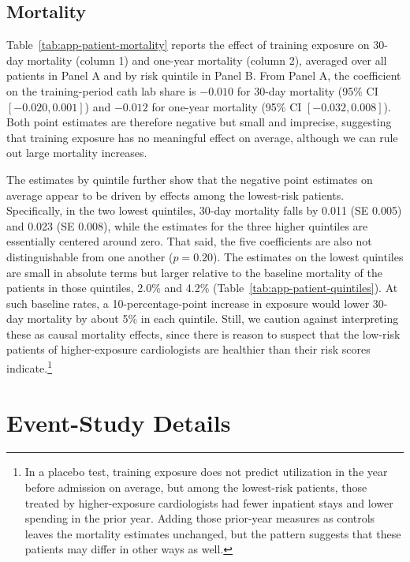 \documentclass[12pt]{article}
\begin{document}
\subsection{Mortality}\label{sec:app-patient-mortality}

Table~\ref{tab:app-patient-mortality} reports the effect of training exposure on 30-day mortality (column 1) and one-year mortality (column 2), averaged over all patients in Panel A and by risk quintile in Panel B. From Panel A, the coefficient on the training-period cath lab share is $-0.010$ for 30-day mortality (95\% CI $[-0.020, 0.001]$) and $-0.012$ for one-year mortality (95\% CI $[-0.032, 0.008]$). Both point estimates are therefore negative but small and imprecise, suggesting that training exposure has no meaningful effect on average, although we can rule out large mortality increases.

The estimates by quintile further show that the negative point estimates on average appear to be driven by effects among the lowest-risk patients. Specifically, in the two lowest quintiles, 30-day mortality falls by 0.011 (SE 0.005) and 0.023 (SE 0.008), while the estimates for the three higher quintiles are essentially centered around zero. That said, the five coefficients are also not distinguishable from one another ($p = 0.20$). The estimates on the lowest quintiles are small in absolute terms but larger relative to the baseline mortality of the patients in those quintiles, 2.0\% and 4.2\% (Table~\ref{tab:app-patient-quintiles}). At such baseline rates, a 10-percentage-point increase in exposure would lower 30-day mortality by about 5\% in each quintile. Still, we caution against interpreting these as causal mortality effects, since there is reason to suspect that the low-risk patients of higher-exposure cardiologists are healthier than their risk scores indicate.\footnote{In a placebo test, training exposure does not predict utilization in the year before admission on average, but among the lowest-risk patients, those treated by higher-exposure cardiologists had fewer inpatient stays and lower spending in the prior year. Adding those prior-year measures as controls leaves the mortality estimates unchanged, but the pattern suggests that these patients may differ in other ways as well.}

\section{Event-Study Details}\label{sec:app-es}
\end{document}

